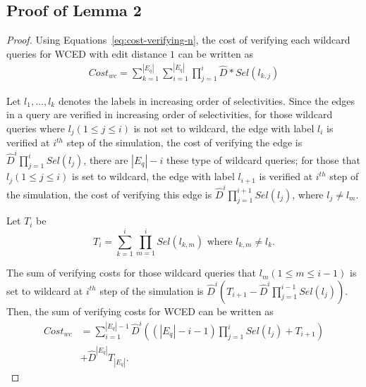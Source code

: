 \documentclass{sigmod}
\begin{document}
\subsection{Proof of Lemma 2}
\begin{proof}

Using Equations~\ref{eq:cost-verifying-n}, the cost of verifying each wildcard queries for WCED with edit distance $1$ can be written as
\begin{align*}
Cost_{wc} =\sum_{k = 1}^{|E_q|}\sum_{i=1}^{|E_q|}\prod_{j = 1}^i\hat{D}*Sel(l_{k,j})
\end{align*}

Let $l_1,\ldots,l_k$ denotes the labels in increasing order of selectivities. Since the edges in a query are verified in increasing order of selectivities, for those wildcard queries where $l_j (1\leq j \leq i)$ is not set to wildcard, the edge with label $l_i$ is verified at $i^{th}$ step of the simulation,  the cost of verifying the edge is $\hat{D}^i\prod_{j=1}^iSel(l_j)$, there are $|E_q| - i$ these type of wildcard queries; for those that $l_j (1\leq j \leq i)$ is set to wildcard, the edge with label $l_{i+1}$ is verified at $i^{th}$ step of the simulation, the cost of verifying this edge is $\hat{D}^i\prod_{j=1}^{i+1}Sel(l_j)$, where $l_j \not= l_m$. 

Let $T_i$ be
\begin{equation}
\label{eq:tl}
T_i = \sum_{k=1}^{i} \prod_{m=1}^{i} Sel(l_{k,m}) \text{ where } l_{k,m} \not= l_k.
\end{equation}

The sum of verifying costs for those wildcard queries that $l_m (1\leq m \leq i - 1)$ is set to wildcard at $i^{th}$ step of the simulation is $\hat{D}^i(T_{i+1} - \hat{D}^i\prod_{j=1}^{i-1}Sel(l_j))$.
Then, the sum of verifying costs for WCED can be written as 
\begin{align*}
Cost_{wc}&=\sum_{i=1}^{|E_q| - 1}\hat{D}^i((|E_q| - i - 1)\prod_{j=1}^i Sel(l_j) + T_{i+1})\\
&+\hat{D}^{|E_q|}T_{|E_q|}.
\end{align*}


\end{proof}
\end{document}
